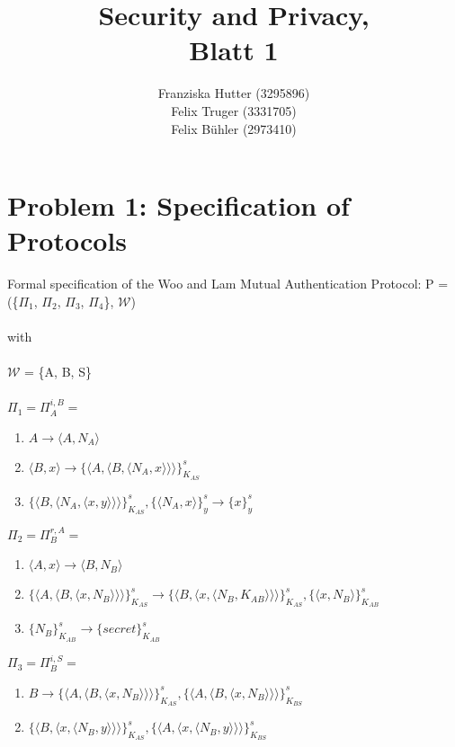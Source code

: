 \documentclass[12pt,pdftex,a4paper]{article}
\title{Security and Privacy,\\ Blatt 1}
\author{Franziska Hutter (3295896)\\
	Felix Truger (3331705)\\
	Felix Bühler (2973410)}
\newcommand\tab[1][1cm]{\hspace*{#1}}
\begin{document}
\maketitle
\pagebreak

\section*{Problem 1: Specification of Protocols}
Formal specification of the Woo and Lam Mutual Authentication Protocol:
\linebreak\linebreak
P = (\{$\Pi_1$, $\Pi_2$, $\Pi_3$, $\Pi_4$\}, $\mathcal{W}$)\\~\\
with\\~\\
$\mathcal{W}$ = \{A, B, S\}\\~\\

$\Pi_1 = \Pi_A^{i,B} =$
\begin{enumerate}
	\item \tab $ A \rightarrow \langle A, N_A\rangle $
	\item \tab $ \langle B, x \rangle \rightarrow \{\langle A, \langle B, \langle N_A, x\rangle\rangle\rangle\}_{K_{AS}}^s$	
	\item \tab $ \{\langle B,\langle N_A, \langle x, y\rangle\rangle\rangle\}_{K_{AS}}^{s}, \{\langle N_A, x\rangle\}_y^s \rightarrow \{x\}_y^s $
\end{enumerate} 

$\Pi_2 = \Pi_B^{r,A} =$
\begin{enumerate}
\item \tab $\langle A, x\rangle \rightarrow \langle B, N_B \rangle$
\item \tab $\{\langle A, \langle B, \langle x, N_B \rangle\rangle\rangle\}_{K_{AS}}^s
\rightarrow \{\langle B,\langle x, \langle N_B, K_{AB}\rangle\rangle\rangle\}_{K_{AS}}^{s}, \{\langle x, N_B\rangle\}_{K_{AB}}^s$
\item \tab $ \{N_B\}_{K_{AB}}^s \rightarrow \{secret\}_{K_{AB}}^s$
\end{enumerate}

$\Pi_3 = \Pi_B^{i,S} =$
\begin{enumerate}
\item \tab $ B \rightarrow \{\langle A, \langle B, \langle x, N_B \rangle\rangle\rangle\}_{K_{AS}}^s, \{\langle A, \langle B, \langle x, N_B \rangle\rangle\rangle\}_{K_{BS}}^s $
\item \tab $ \{\langle B, \langle x, \langle N_B, y\rangle\rangle\rangle\}_{K_{AS}}^s,\{\langle A, \langle x, \langle N_B, y\rangle\rangle\rangle\}_{K_{BS}}^s $
\end{enumerate}
\end{document}
